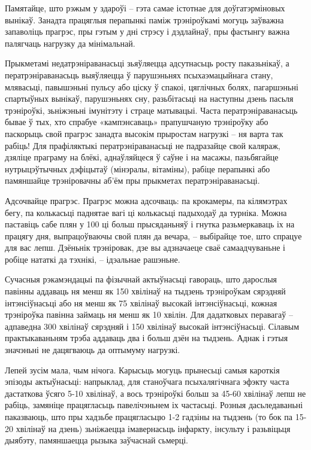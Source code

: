 Памятайце, што рэжым у здароўі – гэта самае істотнае для доўгатэрміновых вынікаў. Занадта працяглыя перапынкі паміж трэніроўкамі могуць заўважна запаволіць прагрэс, пры гэтым у дні стрэсу і дэдлайнаў, пры фастынгу важна палягчаць нагрузку да мінімальнай.

Прыкметамі недатрэніраванасьці зьяўляецца адсутнасьць росту паказьнікаў, а ператрэніраванасьць выяўляецца ў парушэньнях псыхаэмацыйнага стану, млявасьці, павышэньні пульсу або ціску ў спакоі, цяглічных болях, пагаршэньні спартыўных вынікаў, парушэньнях сну, разьбітасьці на наступны дзень пасьля трэніроўкі, зьніжэньні імунітэту і страце матывацыі. Часта ператрэніраванасьць бывае ў тых, хто спрабуе «кампэнсаваць» прапушчаную трэніроўку або паскорыць свой прагрэс занадта высокім прыростам нагрузкі – ня варта так рабіць! Для прафіляктыкі ператрэніраванасьці не падразайце свой каляраж, дзяліце праграму на блёкі, аднаўляйцеся ў саўне і на масажы, пазьбягайце нутрыцэўтычных дэфіцытаў (мінэралы, вітаміны), рабіце перапынкі або памяншайце трэніровачны аб'ём пры прыкметах ператрэніраванасьці.

Адсочвайце прагрэс. Прагрэс можна адсочваць: па крокамеры, па кілямэтрах бегу, па колькасьці паднятае вагі ці колькасьці падыходаў да турніка. Можна паставіць сабе плян у 100 ці больш прысяданьняў і гнутка разьмеркаваць іх на працягу дня, выпрацоўваючы свой плян да вечара, – выбірайце тое, што спрацуе для вас лепш. Дзёньнік трэніровак, дзе вы адзначаеце сваё самаадчуваньне і робіце нататкі да тэхнікі, – ідэальнае рашэньне.

Сучасныя рэкамэндацыі па фізычнай актыўнасьці гавораць, што дарослыя павінны аддаваць ня менш як 150 хвілінаў на тыдзень трэніроўкам сярэдняй інтэнсіўнасьці або ня менш як 75 хвілінаў высокай інтэнсіўнасьці, кожная трэніроўка павінна займаць ня менш як 10 хвілін. Для дадатковых перавагаў – адпаведна 300 хвілінаў сярэдняй і 150 хвілінаў высокай інтэнсіўнасьці. Сілавым практыкаваньням трэба аддаваць два і больш дзён на тыдзень. Аднак і гэтыя значэньні не дацягваюць да оптымуму нагрузкі.

Лепей зусім мала, чым нічога. Карысьць могуць прынесьці самыя кароткія эпізоды актыўнасьці: напрыклад, для станоўчага псыхалягічнага эфэкту часта дастаткова ўсяго 5-10 хвілінаў, а вось трэніроўкі больш за 45-60 хвілінаў лепш не рабіць, замяніце працягласьць павелічэньнем іх частасьці. Розныя дасьледаваньні паказваюць, што пры хадзьбе працягласьцю 1-2 гадзіны на тыдзень (то бок па 15-20 хвілінаў на дзень) зьніжаецца імавернасьць інфаркту, інсульту і разьвіцьця дыябэту, памяншаецца рызыка заўчаснай сьмерці.

